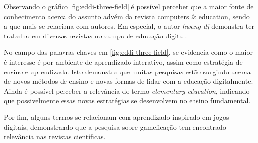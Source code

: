 Observando o gráfico \ref{fig:eddi-three-field} é possível perceber que a maior fonte de conhecimento acerca do assunto advém da revista computers & education, sendo a que mais se relaciona com autores. Em especial, o autor \textit{hwang dj} demonstra ter trabalho em diversas revistas no campo de educação digital.

No campo das palavras chaves em \ref{fig:eddi-three-field}, se evidencia como o maior é interesse é por ambiente de aprendizado interativo, assim como estratégia de ensino e aprendizado. Isto demonstra que muitas pesquisas estão surgindo acerca de novos métodos de ensino e novas formas de lidar com a educação digitalmente. Ainda é possível perceber a relevância do termo \textit{elementary education}, indicando que possivelmente essas novas estratégias se desenvolvem no ensino fundamental.

Por fim, alguns termos se relacionam com aprendizado inspirado em jogos digitais, demonstrando que a pesquisa sobre gameficação tem encontrado relevância nas revistas científicas.



